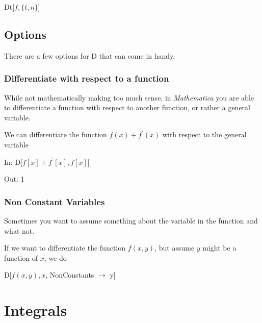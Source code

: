 \documentclass[11pt,letterpaper,twoside,titlepage]{book}
\newcommand{\Mathematica}{\textit{Mathematica} }
\begin{document}
						\begin{center}
					
							Dt[$f, \{t, n \}$]
					
						\end{center}
						
				\subsection{Options}
				
					There are a few options for D that can come in handy.
					
					\subsubsection{Differentiate with respect to a function}
					
						While not mathematically making too much sense, in \Mathematica you are able to differentiate a function with respect to another function, or rather a general variable.  
						
						We can differentiate the function $f(x) + f^\prime(x)$ with respect to the general variable 
						
						\begin{center}
						
							In: D[$f[x] + f^\prime[x], f[x]$]
							
							Out: 1
						
						\end{center}
						
					\subsubsection{Non Constant Variables}
					
						Sometimes you want to assume something about the variable in the function and what not.  
						
						If we want to differentiate the function $f(x,y)$, but assume $y$ might be a function of $x$, we do
						
						\begin{center}
						
							D[$f(x,y),x$, NonConstants $\rightarrow$ y]
						
						\end{center}
						
			\section{Integrals}
		
\end{document}
